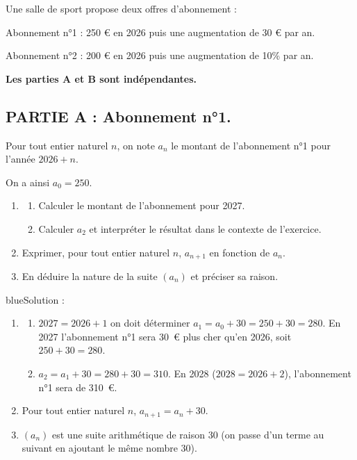 Une salle de sport propose deux offres d'abonnement :

Abonnement n°1 : 250 \euro{} en 2026 puis une augmentation de 30 \euro{} par an.

Abonnement n°2 : 200 \euro{} en 2026 puis une augmentation de 10\% par an.

\textbf{Les parties A et B sont indépendantes.}


\subsection*{PARTIE A : Abonnement n°1.}

Pour tout entier naturel $n$, on note $a_n$ le montant de l'abonnement n°1 pour l'année $2026+n$.

On a ainsi $a_0=250$.
\begin{enumerate}
\item
\begin{enumerate}[label=\alph*)]
\item Calculer le montant de l'abonnement pour 2027.
\item Calculer $a_2$ et interpréter le résultat dans le contexte de l'exercice.
\end{enumerate}
\item Exprimer, pour tout entier naturel $n$, $a_{n+1}$ en fonction de $a_n$.
\item En déduire la nature de la suite $(a_n)$ et 
préciser sa raison.
\end{enumerate}

\begin{color}{blue}Solution :\par
\begin{enumerate}
\item
\begin{enumerate}[label=\alph*)]
\item $2027=2026+1$ on doit déterminer $a_{1}=a_{0} + 30 = 250 + 30 = 280$. En 2027 l'abonnement n°1 sera 30~\euro{} plus cher qu'en 2026, soit $250+30=280$.
\item $a_{2}=a_{1} + 30 = 280 + 30 = 310$. En 2028 ($2028=2026+2$), l'abonnement n°1 sera de 310~\euro{}.

\end{enumerate}
\item Pour tout entier naturel $n$, $a_{n+1} = a_n + 30 $.
\item $(a_n)$ est une suite arithmétique de raison 30 (on passe d'un terme au suivant en ajoutant le même nombre 30).
\end{enumerate}
\end{color}

